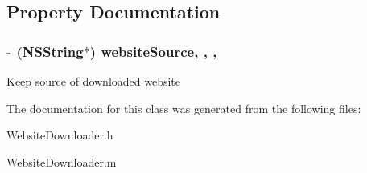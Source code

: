 \subsection{Property Documentation}
\hypertarget{interface_website_downloader_a4c8d1bb47c74f6d1b1f2c07a83777da2}{
\subsubsection[{website\-Source}]{\setlength{\rightskip}{0pt plus 5cm}-\/ (N\-S\-String$\ast$) website\-Source\hspace{0.3cm}{\ttfamily [read]}, {\ttfamily [write]}, {\ttfamily [nonatomic]}, {\ttfamily [strong]}}}\label{interface_website_downloader_a4c8d1bb47c74f6d1b1f2c07a83777da2}
Keep source of downloaded website 

The documentation for this class was generated from the following files\-:\begin{DoxyCompactItemize}
\item 
Website\-Downloader.\-h\item 
Website\-Downloader.\-m\end{DoxyCompactItemize}
